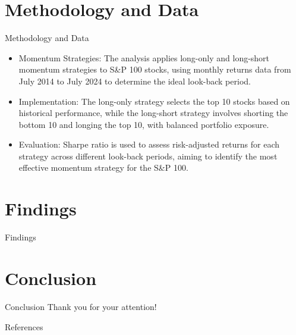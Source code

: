 \documentclass{beamer}
\begin{document}
\section{Methodology and Data}
\begin{frame}{Methodology and Data}
\begin{itemize}
        \item Momentum Strategies: The analysis applies long-only and long-short momentum strategies to S&P 100 stocks, using monthly returns data from July 2014 to July 2024 to determine the ideal look-back period.
        \item Implementation: The long-only strategy selects the top 10 stocks based on historical performance, while the long-short strategy involves shorting the bottom 10 and longing the top 10, with balanced portfolio exposure.
        \item Evaluation: Sharpe ratio is used to assess risk-adjusted returns for each strategy across different look-back periods, aiming to identify the most effective momentum strategy for the S&P 100.
    \end{itemize}
\end{frame}

\section{Findings}
\begin{frame}{Findings}
\textcite{lo2004adaptive}
\end{frame}

\section{Conclusion}
\begin{frame}{Conclusion}
    Thank you for your attention!
\end{frame}


\begin{frame}{References}
    \printbibliography
\end{frame}
\end{document}
